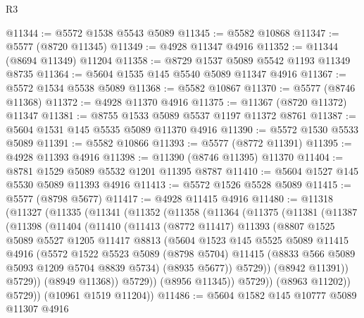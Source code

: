 \begin{lexlean}{R3}
\begin{coremodule}
@11344 := @5572 @1538 @5543 @5089
@11345 := @5582 @10868
@11347 := @5577 (@8720 @11345)
@11349 := @4928 @11347 @4916
@11352 := @11344 (@8694 @11349) @11204
@11358 := @8729 @1537 @5089 @5542 @1193 @11349 @8735
@11364 := @5604 @1535 @145 @5540 @5089 @11347 @4916
@11367 := @5572 @1534 @5538 @5089
@11368 := @5582 @10867
@11370 := @5577 (@8746 @11368)
@11372 := @4928 @11370 @4916
@11375 := @11367 (@8720 @11372) @11347
@11381 := @8755 @1533 @5089 @5537 @1197 @11372 @8761
@11387 := @5604 @1531 @145 @5535 @5089 @11370 @4916
@11390 := @5572 @1530 @5533 @5089
@11391 := @5582 @10866
@11393 := @5577 (@8772 @11391)
@11395 := @4928 @11393 @4916
@11398 := @11390 (@8746 @11395) @11370
@11404 := @8781 @1529 @5089 @5532 @1201 @11395 @8787
@11410 := @5604 @1527 @145 @5530 @5089 @11393 @4916
@11413 := @5572 @1526 @5528 @5089
@11415 := @5577 (@8798 @5677)
@11417 := @4928 @11415 @4916
@11480 := @11318
    (@11327
      (@11335
        (@11341
          (@11352
            (@11358
              (@11364
                (@11375
                  (@11381
                    (@11387
                      (@11398
                        (@11404
                          (@11410
                            (@11413
                              (@8772 @11417)
                              @11393
                              (@8807
                                @1525
                                @5089
                                @5527
                                @1205
                                @11417
                                @8813
                                (@5604
                                  @1523
                                  @145
                                  @5525
                                  @5089
                                  @11415
                                  @4916
                                  (@5572
                                    @1522
                                    @5523
                                    @5089
                                    (@8798 @5704)
                                    @11415
                                    (@8833 @566 @5089 @5093 @1209 @5704 @8839 @5734)
                                    (@8935 @5677))
                                  @5729))
                              (@8942 @11391))
                            @5729))
                        (@8949 @11368))
                      @5729))
                  (@8956 @11345))
                @5729))
            (@8963 @11202))
          @5729))
      (@10961 @1519 @11204))
@11486 := @5604 @1582 @145 @10777 @5089 @11307 @4916

\end{coremodule}
\end{lexlean}
